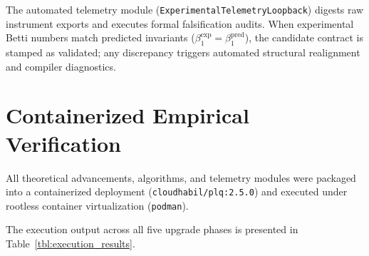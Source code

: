 \documentclass[11pt, a4paper]{article}
\theoremstyle{definition}
\theoremstyle{plain}
\theoremstyle{remark}
\begin{document}
\begin{table}[htbp]
\centering
\small
\renewcommand{\arraystretch}{1.2}
\caption{The four experimental Standard Operating Procedures (SOPs) integrated into the automated telemetry validation pipeline.}
\label{tbl:sops}
\end{table}

The automated telemetry module (\texttt{ExperimentalTelemetryLoopback}) digests raw instrument exports and executes formal falsification audits. When experimental Betti numbers match predicted invariants ($\beta_1^{\text{exp}} = \beta_1^{\text{pred}}$), the candidate contract is stamped as validated; any discrepancy triggers automated structural realignment and compiler diagnostics.

\section{Containerized Empirical Verification}
\label{sec:empirical_verification}

All theoretical advancements, algorithms, and telemetry modules were packaged into a containerized deployment (\texttt{cloudhabil/plq:2.5.0}) and executed under rootless container virtualization (\texttt{podman}).

The execution output across all five upgrade phases is presented in Table~\ref{tbl:execution_results}.
\end{document}
